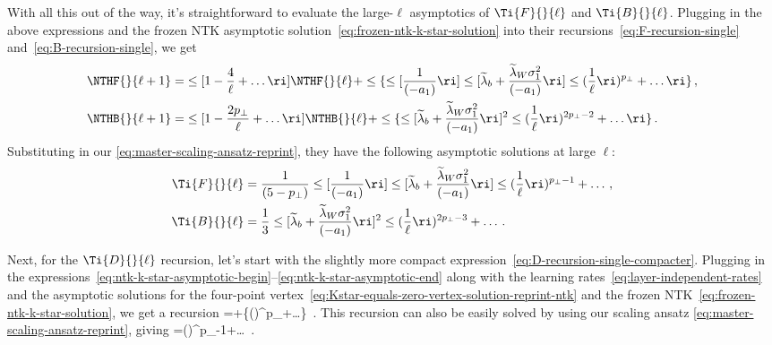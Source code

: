 With all this out of the way, it's straightforward to evaluate the large-$\ell$ asymptotics of $\Ti{F}{}{\ell}$ and $\Ti{B}{}{\ell}$. Plugging in the above expressions and the frozen NTK asymptotic solution~\eqref{eq:frozen-ntk-k-star-solution} into their recursions~\eqref{eq:F-recursion-single} and~\eqref{eq:B-recursion-single}, we get
\begin{align}
\NTHF{}{\ell+1}=&\le[1-\frac{4}{\ell}+\ldots\ri]\NTHF{}{\ell}+\le\{\le[\frac{1}{(-a_1)}\ri]\le[\widetilde{\lambda}_b+\frac{\widetilde{\lambda}_W\sigma_1^2}{(-a_1)}\ri]\le(\frac{1}{\ell}\ri)^{p_{\perp}}+\ldots\ri\}\, , \\
\NTHB{}{\ell+1}=&\le[1-\frac{2p_{\perp}}{\ell}+\ldots\ri]\NTHB{}{\ell}+\le\{\le[\widetilde{\lambda}_b+\frac{\widetilde{\lambda}_W\sigma_1^2}{(-a_1)}\ri]^2 \le(\frac{1}{\ell}\ri)^{2p_{\perp}-2}+\ldots\ri\}\, .
\end{align}
Substituting in our  \eqref{eq:master-scaling-ansatz-reprint}, they have the following asymptotic solutions at large $\ell$:
\begin{align}
\Ti{F}{}{\ell}&=\frac{1}{(5-p_{\perp})}\le[\frac{1}{(-a_1)}\ri] \le[\widetilde{\lambda}_b+\frac{\widetilde{\lambda}_W\sigma_1^2}{(-a_1)}\ri]\le(\frac{1}{\ell}\ri)^{p_{\perp}-1}+\ldots\, ,\label{eq:F-k-star-solution}\\
\Ti{B}{}{\ell}&=\frac{1}{3} \le[\widetilde{\lambda}_b+\frac{\widetilde{\lambda}_W\sigma_1^2}{(-a_1)}\ri]^2\le(\frac{1}{\ell}\ri)^{2p_{\perp}-3}+\ldots\, .\label{eq:B-k-star-solution}
\end{align}


Next, for the $\Ti{D}{}{\ell}$ recursion, let's start with the slightly more compact expression~\eqref{eq:D-recursion-single-compacter}.
Plugging in the expressions~\eqref{eq:ntk-k-star-asymptotic-begin}--\eqref{eq:ntk-k-star-asymptotic-end} along with the learning rates~\eqref{eq:layer-independent-rates} and the asymptotic solutions for the four-point vertex~\eqref{eq:Kstar-equals-zero-vertex-solution-reprint-ntk} and the frozen NTK~\eqref{eq:frozen-ntk-k-star-solution}, we get a recursion
\be
{}=\!\!\!\NTHD{}{\ell}+\le\{\le[\frac{2}{3(-a_1)}\ri]\!\!\!\!\le(\ri)^{p_{\perp}}\!\!\!\!\!+\ldots\ri\}\, .
\ee
This recursion can also be easily solved by using our scaling ansatz \eqref{eq:master-scaling-ansatz-reprint}, giving
\be\label{eq:D-k-star-solution}
\NTHD{}{\ell}=\le(\ri)^{p_{\perp}-1}+\ldots\, .
\ee

